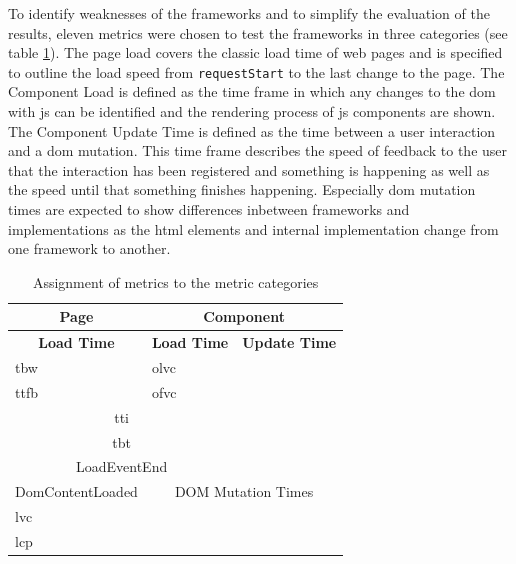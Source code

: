 \documentclass[a4paper, 12pt]{article}
\begin{document}
To identify weaknesses of the frameworks and to simplify the evaluation of the results, eleven metrics were chosen to test the frameworks in three categories (see table \ref{tab:metriccategories}).
The page load covers the classic load time of web pages and is specified to outline the load speed from \verb|requestStart| to the last change to the page.
The Component Load is defined as the time frame in which any changes to the \acrshort{dom} with \acrshort{js} can be identified and the rendering process of \acrshort{js} components are shown.
The Component Update Time is defined as the time between a user interaction and a \acrshort{dom} mutation.
This time frame describes the speed of feedback to the user that the interaction has been registered and something is happening as well as the speed until that something finishes happening.
Especially \acrshort{dom} mutation times are expected to show differences inbetween frameworks and implementations as the \acrshort{html} elements and internal implementation change from one framework to another.

\begin{table}[h]
  \begin{center}
    \begin{tabular}[h]{|l|l|l|}
      \hline
      \multicolumn{1}{|c|}{\textbf{Page}}       & \multicolumn{2}{c|}{\textbf{Component}}     \\ \hline
      \multicolumn{1}{|c|}{\textbf{Load Time}}  & \textbf{Load Time}  & \textbf{Update Time}  \\ \hline
      \acrlong{tbw}                             & \acrlong{olvc}      &                       \\ \hline
      \acrlong{ttfb}                            & \acrlong{ofvc}      &                       \\ \hline
      \multicolumn{2}{|c|}{\acrlong{tti}}                             &                       \\ \hline
      \multicolumn{2}{|c|}{\acrlong{tbt}}                             &                       \\ \hline
      \multicolumn{2}{|c|}{LoadEventEnd}                              &                       \\ \hline
      DomContentLoaded                          & \multicolumn{2}{c|}{DOM Mutation Times}     \\ \hline
      \acrlong{lvc}                             &                               &             \\ \hline
      \acrlong{lcp}                             &                               &             \\ \hline
    \end{tabular}
  \end{center}
  \caption{Assignment of metrics to the metric categories}
  \label{tab:metriccategories}
\end{table}
\end{document}

